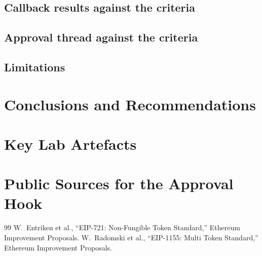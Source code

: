 \documentclass[peerreview]{IEEEtran}
\begin{document}
\subsection{Callback results against the criteria}

\subsection{Approval thread against the criteria}

\subsection{Limitations}

\section{Conclusions and Recommendations}

\appendices
\section{Key Lab Artefacts}

\section{Public Sources for the Approval Hook}

\begin{thebibliography}{99}
 W.~Entriken et al., ``EIP-721: Non-Fungible Token Standard,'' Ethereum Improvement Proposals.
 W.~Radomski et al., ``EIP-1155: Multi Token Standard,'' Ethereum Improvement Proposals.
\end{thebibliography}
\end{document}

